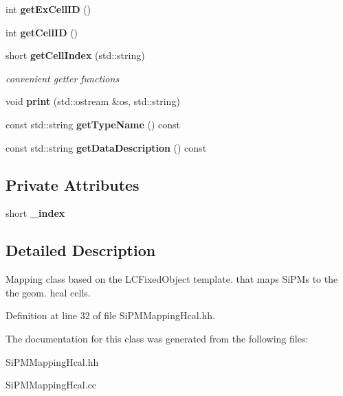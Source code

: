 \begin{DoxyCompactItemize}
\item 
int {\bfseries getExCellID} ()\label{classCALICE_1_1SiPMMappingHcal_a51e789afa8b332823ee3466931b4c41e}

\item 
int {\bfseries getCellID} ()\label{classCALICE_1_1SiPMMappingHcal_a51767a9933267022ef380180d2ff8e31}

\item 
short {\bf getCellIndex} (std::string)\label{classCALICE_1_1SiPMMappingHcal_a6c9e24b4de7ca1d73f6e408a7545acaf}

\begin{DoxyCompactList}\small\item\em convenient getter functions \item\end{DoxyCompactList}\item 
void {\bfseries print} (std::ostream \&os, std::string)\label{classCALICE_1_1SiPMMappingHcal_a98286b2ec859508c802a321e8e534ab6}

\item 
const std::string {\bfseries getTypeName} () const \label{classCALICE_1_1SiPMMappingHcal_a346183364fe44c07c4f5de7d8cd552b1}

\item 
const std::string {\bfseries getDataDescription} () const \label{classCALICE_1_1SiPMMappingHcal_a6d35194870c3e2a16336e3582e80532f}

\end{DoxyCompactItemize}
\subsection*{Private Attributes}
\begin{DoxyCompactItemize}
\item 
short {\bfseries \_\-index}\label{classCALICE_1_1SiPMMappingHcal_a9ce9e5e9ffed61ae7ac85f230afaaf6c}

\end{DoxyCompactItemize}


\subsection{Detailed Description}
Mapping class based on the LCFixedObject template. that maps SiPMs to the the geom. hcal cells. 

Definition at line 32 of file SiPMMappingHcal.hh.

The documentation for this class was generated from the following files:\begin{DoxyCompactItemize}
\item 
SiPMMappingHcal.hh\item 
SiPMMappingHcal.cc\end{DoxyCompactItemize}
